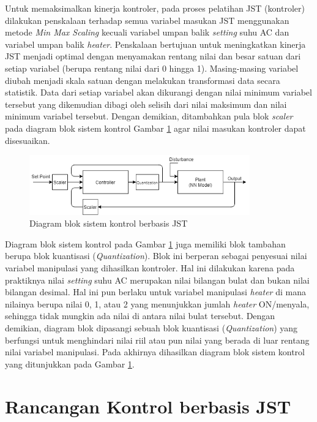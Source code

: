 Untuk memaksimalkan kinerja kontroler, pada proses pelatihan JST (kontroler) dilakukan penskalaan terhadap semua variabel masukan JST menggunakan metode \textit{Min Max Scaling} kecuali variabel umpan balik \textit{setting} suhu AC dan variabel umpan balik \textit{heater}. Penskalaan bertujuan untuk meningkatkan kinerja JST menjadi optimal dengan menyamakan rentang nilai dan besar satuan dari setiap variabel (berupa rentang nilai dari 0 hingga 1). Masing-masing variabel diubah menjadi skala satuan dengan melakukan transformasi data secara statistik. Data dari setiap variabel akan dikurangi dengan nilai minimum variabel tersebut yang dikemudian dibagi oleh selisih dari nilai maksimum dan nilai minimum variabel tersebut. Dengan demikian, ditambahkan pula blok \textit{scaler} pada diagram blok sistem kontrol Gambar \ref{fig:5:ConstrolSystemBlockDiagram} agar nilai masukan kontroler dapat disesuaikan.

\begin{figure}[!h]
	\centering
	\includegraphics[width=0.85\textwidth]{figures/ControlDesignDiagramII}
	\caption{Diagram blok sistem kontrol berbasis JST}
	\label{fig:5:ConstrolSystemBlockDiagram}
\end{figure}

Diagram blok sistem kontrol pada Gambar \ref{fig:5:ConstrolSystemBlockDiagram} juga memiliki blok tambahan berupa blok kuantisasi (\textit{Quantization}). Blok ini berperan sebagai penyesuai nilai variabel manipulasi yang dihasilkan kontroler. Hal ini dilakukan karena pada praktiknya nilai \textit{setting} suhu AC merupakan nilai bilangan bulat dan bukan nilai bilangan desimal. Hal ini pun berlaku untuk variabel manipulasi \textit{heater} di mana nilainya berupa nilai 0, 1, atau 2 yang menunjukkan jumlah \textit{heater} ON/menyala, sehingga tidak mungkin ada nilai di antara nilai bulat tersebut. Dengan demikian, diagram blok dipasangi sebuah blok kuantisasi (\textit{Quantization}) yang berfungsi untuk menghindari nilai riil atau pun nilai yang berada di luar rentang nilai variabel manipulasi. Pada akhirnya dihasilkan diagram blok sistem kontrol yang ditunjukkan pada Gambar \ref{fig:5:ConstrolSystemBlockDiagram}.

\section{Rancangan Kontrol berbasis JST}

